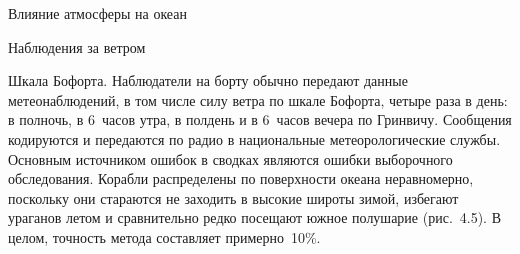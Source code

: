 \begin{chapter}{Влияние атмосферы на океан}
\begin{section}{Наблюдения за ветром}
\begin{paragraph}{Шкала Бофорта.}
Наблюдатели на борту обычно передают данные метеонаблюдений, в том
числе силу ветра по шкале Бофорта, четыре раза в день: в полночь, в
6~часов утра, в полдень и в 6~часов вечера по Гринвичу. Сообщения
кодируются и передаются по радио в национальные метеорологические
службы. Основным источником ошибок в сводках являются ошибки выборочного 
обследования. Корабли распределены по поверхности океана неравномерно, 
поскольку они стараются не заходить в высокие широты зимой, избегают ураганов
летом и сравнительно редко посещают южное полушарие (рис.~4.5). В целом,
точность метода составляет примерно~10\%.
%

\end{paragraph}


\end{section}
\end{chapter}
